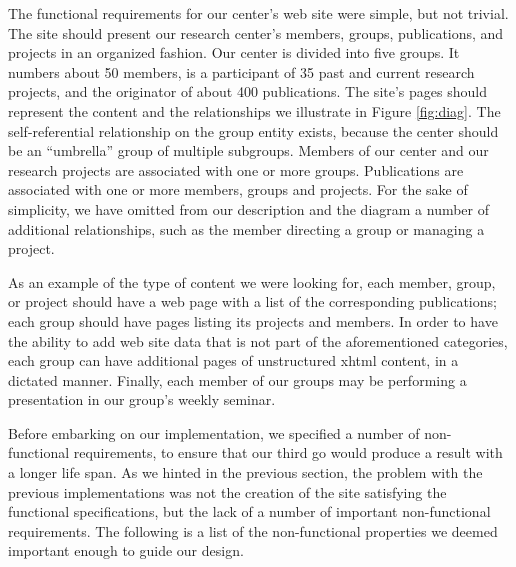 \documentclass{article}
\begin{document}
The functional requirements for our center's web site were
simple, but not trivial.
The site should present our research center's members, groups, publications,
and projects in an organized fashion.
Our center is divided into five groups.
It numbers about 50 members, is a participant of 35 past and current research
projects, and the originator of about 400 publications.
The site's pages should represent the content and the relationships
we illustrate in Figure \ref{fig:diag}.
The self-referential relationship on the group entity exists, because the center should be an ``umbrella'' group of multiple subgroups. Members of our center and our research projects are associated
with one or more groups.
Publications are associated
with one or more members, groups and projects.
For the sake of simplicity,
we have omitted from our description and the diagram
a number of additional relationships,
such as the member directing a group or managing a project.

As an example of the type of content we were looking for, 
each member, group, or project should have a web page with a list
of the corresponding publications;
each group should have pages listing its projects and members. 
In order to have the ability to add web site data that is not part of the aforementioned categories,
each group can have additional pages of unstructured {\sc xhtml} content, in a dictated manner.
Finally, each member of our groups may be performing a presentation in our group's weekly seminar.

Before embarking on our implementation,
we specified a number of non-functional requirements, to ensure that our 
third go would produce a result with a longer life span.
As we hinted in the previous section, the problem with
the previous implementations was not the creation of the site
satisfying the functional specifications,
but the lack of a number of important non-functional requirements.
The following is a list of the non-functional properties
we deemed important enough to guide our design.
\end{document}

